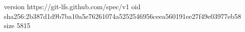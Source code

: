version https://git-lfs.github.com/spec/v1
oid sha256:2b387d1d9b7ba10a5e76261074a5252546956ceea560191ee27f49e03977eb58
size 5815
